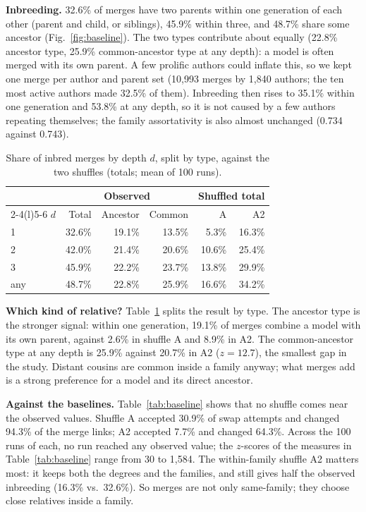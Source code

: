 \documentclass[conference]{IEEEtran}
\begin{document}
\textbf{Inbreeding.} 32.6\% of merges have two parents within one generation of
each other (parent and child, or siblings), 45.9\% within three, and 48.7\%
share some ancestor (Fig.~\ref{fig:baseline}). The two types contribute about
equally (22.8\% ancestor type, 25.9\% common-ancestor type at any depth): a
model is often merged with its own parent. A few prolific authors could inflate
this, so we kept one merge per author and parent set (10,993 merges by 1,840
authors; the ten most active authors made 32.5\% of them). Inbreeding then rises to 35.1\% within one generation and 53.8\% at any
depth, so it is not caused by a few authors repeating themselves; the family
assortativity is also almost unchanged (0.734 against 0.743).

\begin{table}[t]
\caption{Share of inbred merges by depth $d$, split by type, against the two
shuffles (totals; mean of 100 runs).}
\label{tab:inbreeding}
\centering
\footnotesize
\setlength{\tabcolsep}{4pt}
\begin{tabular}{@{}lrrrrr@{}}
\toprule
 & \multicolumn{3}{c}{Observed} & \multicolumn{2}{c}{Shuffled total} \\
\cmidrule(lr){2-4}\cmidrule(l){5-6}
$d$ & Total & Ancestor & Common & A & A2 \\
\midrule
1   & 32.6\% & 19.1\% & 13.5\% & 5.3\%  & 16.3\% \\
2   & 42.0\% & 21.4\% & 20.6\% & 10.6\% & 25.4\% \\
3   & 45.9\% & 22.2\% & 23.7\% & 13.8\% & 29.9\% \\
any & 48.7\% & 22.8\% & 25.9\% & 16.6\% & 34.2\% \\
\bottomrule
\end{tabular}
\end{table}

\textbf{Which kind of relative?} Table~\ref{tab:inbreeding} splits the result
by type. The ancestor type is the stronger signal: within one generation,
19.1\% of merges combine a model with its own parent, against 2.6\% in shuffle A
and 8.9\% in A2. The common-ancestor type at any depth is 25.9\% against 20.7\%
in A2 ($z=12.7$), the smallest gap in the study. Distant cousins are common
inside a family anyway; what merges add is a strong preference for a model
and its direct ancestor.

\textbf{Against the baselines.} Table~\ref{tab:baseline} shows that no shuffle
comes near the observed values. Shuffle A accepted 30.9\% of swap attempts and
changed 94.3\% of the merge links; A2 accepted 7.7\% and changed 64.3\%. Across
the 100 runs of each, no run reached any observed value; the $z$-scores of the
measures in Table~\ref{tab:baseline} range from 30 to 1,584. The within-family shuffle A2 matters most: it keeps both
the degrees and the families, and still gives half the observed inbreeding
(16.3\% vs.\ 32.6\%). So merges are not only same-family; they choose close
relatives inside a family.
\end{document}
